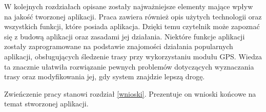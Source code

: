 W kolejnych rozdziałach opisane zostały najważniejsze elementy mające wpływ na jakość tworzonej aplikacji. Praca zawiera również opis użytych technologii oraz wszystkich funkcji, które posiada aplikacja. Dzięki temu czytelnik może zapoznać się z budową aplikacji oraz zasadami jej działania. Niektóre funkcje aplikacji zostały zaprogramowane na podstawie znajomości działania popularnych aplikacji, obsługujących śledzenie trasy przy wykorzystaniu modułu GPS. Wiedza ta znacznie ułatwiła rozwiązanie pewnych problemów dotyczących wyznaczania trasy oraz modyfikowania jej, gdy system znajdzie lepszą drogę.

Zwieńczenie pracy stanowi rozdział \ref{wnioski}. Prezentuje on wnioski końcowe na temat stworzonej aplikacji.

\newpage
